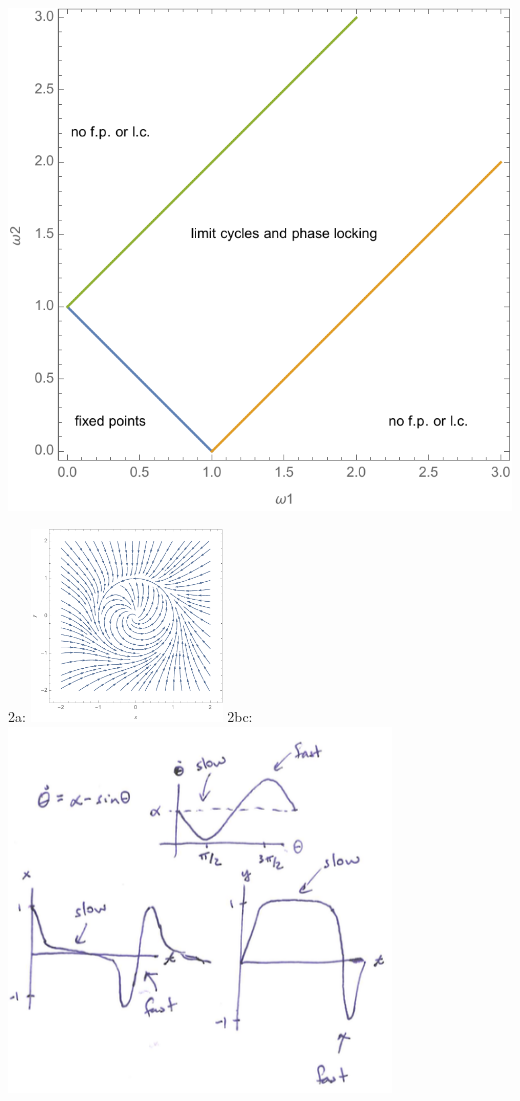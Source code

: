 \documentclass[12pt,letterpaper,noanswers]{exam}
\begin{document}
\includegraphics[scale=0.3]{img/C17plot.pdf}

2a: \includegraphics[width=2in]{img/C15p1.pdf}
2bc: \includegraphics[width=4in]{img/S19C18p4.png}
\end{document}

